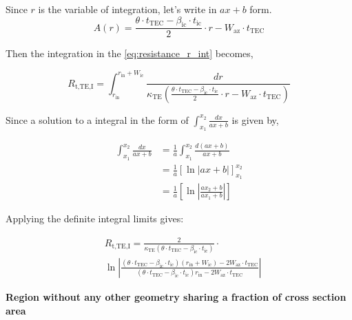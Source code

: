 \documentclass[10pt,a4paper,twocolumn]{article}
\begin{document}
Since $r$ is the variable of integration, let's write in $ax+b$ form.
\begin{equation}
  A(r) = \frac{\theta \cdot t_{\text{TEC}}- \beta_{\text{ic}} \cdot t_{\text{ic}}}{2} \cdot r - W_{\text{az}} \cdot t_{\text{TEC}}
  \label{eq:area_TE_ic}
\end{equation}

Then the integration in the \cref{eq:resistance_r_int} becomes,

\begin{equation*}
  R_{\text{t,TE,I}} = \int_{r_{\text{in}}}^{r_{\text{in}}+W_{\text{ic}}} \frac{dr}{\kappa_{\text{TE}} \left( \frac{\theta \cdot t_{\text{TEC}}- \beta_{\text{ic}} \cdot t_{\text{ic}}}{2} \cdot r - W_{\text{az}} \cdot t_{\text{TEC}} \right)}
\end{equation*}

Since a solution to a integral in the form of $\int_{x_1}^{x_2} \frac{dx}{ax+b}$ is given by,

\begin{equation}
  \begin{aligned}
    \int_{x_1}^{x_2} \frac{dx}{ax+b} & = \frac{1}{a} \int_{x_1}^{x_2} \frac{d(ax+b)}{ax+b}                  \\
                                     & = \frac{1}{a} \left[ \ln|ax+b| \right]_{x_1}^{x_2}                   \\
                                     & = \frac{1}{a} \left[ \ln\left| \frac{ax_2+b}{ax_1+b} \right| \right]
  \end{aligned}
  \label{eq:ax_b_integral_result}
\end{equation}

Applying the definite integral limits gives:

\begin{equation}
  \begin{aligned}
  &R_{\text{t,TE,I}} = \frac{2}{\kappa_{\text{TE}} (\theta \cdot t_{\text{TEC}}- \beta_{\text{ic}} \cdot t_{\text{ic}})} \cdot \\ & \ln \left| \frac{(\theta \cdot t_{\text{TEC}}- \beta_{\text{ic}} \cdot t_{\text{ic}})(r_{\text{in}}+W_{\text{ic}}) - 2 W_{\text{az}} \cdot t_{\text{TEC}}}{(\theta \cdot t_{\text{TEC}}- \beta_{\text{ic}} \cdot t_{\text{ic}})r_{\text{in}} - 2 W_{\text{az}} \cdot t_{\text{TEC}}} \right|
  \end{aligned}
  \label{eq:R_TE_I}
\end{equation}

\textbf{Region without any other geometry sharing  a fraction of cross section area}
\end{document}

